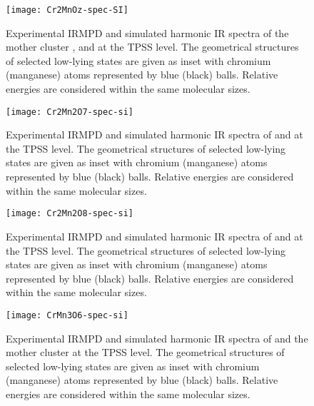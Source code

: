 \begin{figure}
	\centering
	\texttt{[image: Cr2MnOz-spec-SI]}
	\caption{Experimental IRMPD and simulated harmonic IR spectra of the mother cluster , and  at the TPSS level. The geometrical structures of selected low-lying states are given as inset with chromium (manganese) atoms represented by blue (black) balls. Relative energies are considered within the same molecular sizes.}
	\label{figs:Cr2MnOz-spec-si}
\end{figure}



\begin{figure}
	\centering
	\texttt{[image: Cr2Mn2O7-spec-si]}
	\caption{Experimental IRMPD and simulated harmonic IR spectra of  and  at the TPSS level. The geometrical structures of selected low-lying states are given as inset with chromium (manganese) atoms represented by blue (black) balls. Relative energies are considered within the same molecular sizes.}
	\label{figs:Cr2Mn2O7-spec-si}
\end{figure}



\begin{figure}
	\centering
	\texttt{[image: Cr2Mn2O8-spec-si]}
	\caption{Experimental IRMPD and simulated harmonic IR spectra of  and  at the TPSS level. The geometrical structures of selected low-lying states are given as inset with chromium (manganese) atoms represented by blue (black) balls. Relative energies are considered within the same molecular sizes.}
	\label{figs:Cr2Mn2O8-spec-si}
\end{figure}





\begin{figure}
	\centering
	\texttt{[image: CrMn3O6-spec-si]}
	\caption{Experimental IRMPD and simulated harmonic IR spectra of  and the mother cluster  at the TPSS level. The geometrical structures of selected low-lying states are given as inset with chromium (manganese) atoms represented by blue (black) balls. Relative energies are considered within the same molecular sizes.}
	\label{figs:CrMn3O6-spec-si}
\end{figure}





